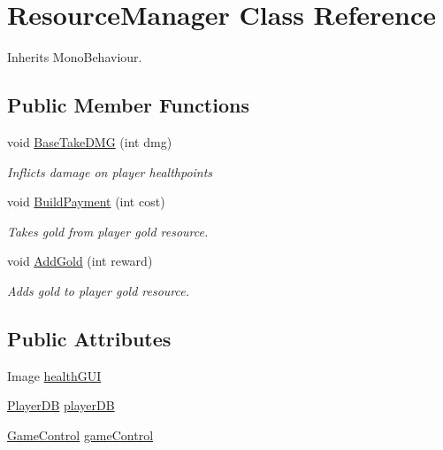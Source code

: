 \hypertarget{class_resource_manager}{}\section{Resource\+Manager Class Reference}
\label{class_resource_manager}


Inherits Mono\+Behaviour.

\subsection*{Public Member Functions}
\begin{DoxyCompactItemize}
\item 
void \hyperlink{class_resource_manager_af9190f976935f6aa8bac7a1a7d2c925e}{Base\+Take\+D\+MG} (int dmg)
\begin{DoxyCompactList}\small\item\em Inflicts damage on player healthpoints \end{DoxyCompactList}\item 
void \hyperlink{class_resource_manager_adec74b83c8824cd3f8177070a3cf83f9}{Build\+Payment} (int cost)
\begin{DoxyCompactList}\small\item\em Takes gold from player \textquotesingle{}gold\textquotesingle{} resource\textquotesingle{}. \end{DoxyCompactList}\item 
void \hyperlink{class_resource_manager_a2dbf4f5ae8c0f2f79cdbe748035924f1}{Add\+Gold} (int reward)
\begin{DoxyCompactList}\small\item\em Adds gold to player \textquotesingle{}gold\textquotesingle{} resource. \end{DoxyCompactList}\end{DoxyCompactItemize}
\subsection*{Public Attributes}
\begin{DoxyCompactItemize}
\item 
Image \hyperlink{class_resource_manager_a45c0d8fe1cb632b0b76f8e83b63573e6}{health\+G\+UI}
\item 
\hyperlink{class_player_d_b}{Player\+DB} \hyperlink{class_resource_manager_a71e5ec59f28266a6368ff748f749c485}{player\+DB}
\item 
\hyperlink{class_game_control}{Game\+Control} \hyperlink{class_resource_manager_a9cba58c85ab8834625b7a2880fd26efe}{game\+Control}
\end{DoxyCompactItemize}


